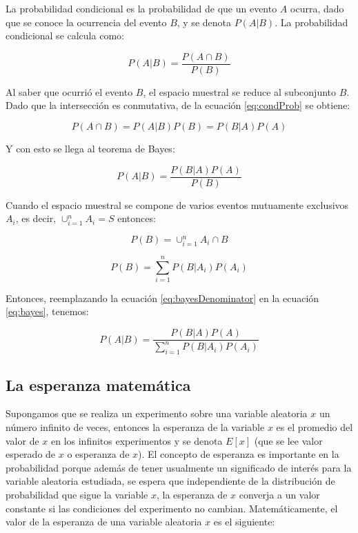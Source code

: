 \documentclass[a4paper, 11pt, oneside]{report}
\begin{document}
La probabilidad condicional es la probabilidad de que un evento $A$ ocurra, dado que se conoce la ocurrencia del evento $B$, y se denota $P(A|B)$. La probabilidad condicional se calcula como:

	\begin{equation}\label{eq:condProb}
		P(A|B) = \frac{P(A \cap B)}{P(B)}
	\end{equation}

Al saber que ocurrió el evento $B$, el espacio muestral se reduce al subconjunto $B$. Dado que la intersección es conmutativa, de la ecuación \ref{eq:condProb} se obtiene:

\[P(A \cap B) = P(A|B)P(B) = P(B|A)P(A)\]

Y con esto se llega al teorema de Bayes:

	\begin{equation}\label{eq:bayes}
		P(A|B) = \frac{P(B|A)P(A)}{P(B)}
	\end{equation}

Cuando el espacio muestral se compone de varios eventos mutuamente exclusivos $A_i$, es decir, $\cup_{i=1}^{n} A_i = S$ entonces:

	\[P(B)=\cup_{i=1}^{n} {A_i \cap B}\]
	
	\begin{equation}\label{eq:bayesDenominator}
		P(B) = \sum_{i=1}^{n}{P(B|A_i)P(A_i)}
	\end{equation}

Entonces, reemplazando la ecuación \ref{eq:bayesDenominator} en la ecuación \ref{eq:bayes}, tenemos:
	
	\begin{equation}\label{eq:bayes2}
		P(A|B) = \frac{P(B|A)P(A)}{\sum_{i=1}^{n}{P(B|A_i)P(A_i)}}
	\end{equation}
	
\subsection{La esperanza matemática}

Supongamos que se realiza un experimento sobre una variable aleatoria $x$ un número infinito de veces, entonces la esperanza de la variable $x$ es el promedio del valor de $x$ en los infinitos experimentos y se denota $E[x]$ (que se lee valor esperado de $x$ o esperanza de $x$). El concepto de esperanza es importante en la probabilidad porque además de tener usualmente un significado de interés para la variable aleatoria estudiada, se espera que independiente de la distribución de probabilidad que sigue la variable $x$, la esperanza de $x$ converja a un valor constante si las condiciones del experimento no cambian. Matemáticamente, el valor de la esperanza de una variable aleatoria $x$ es el siguiente:
\end{document}
